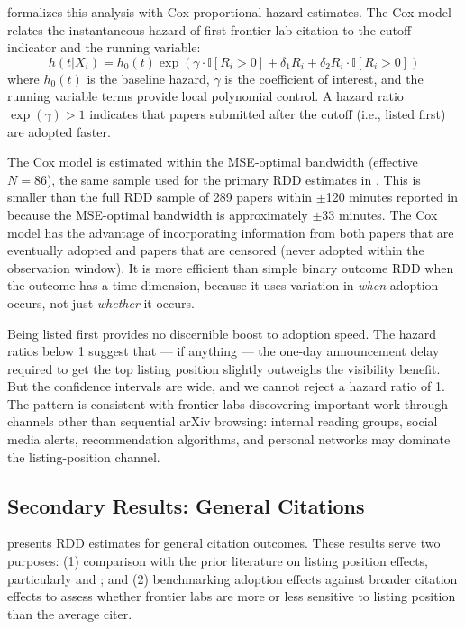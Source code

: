 \documentclass[12pt]{article}
\newcommand{\ind}{\mathbb{I}}
\begin{document}
 formalizes this analysis with Cox proportional hazard estimates. The Cox model relates the instantaneous hazard of first frontier lab citation to the cutoff indicator and the running variable:
\begin{equation}
h(t | X_i) = h_0(t) \exp\left(\gamma \cdot \ind[R_i > 0] + \delta_1 R_i + \delta_2 R_i \cdot \ind[R_i > 0]\right)
\end{equation}
where $h_0(t)$ is the baseline hazard, $\gamma$ is the coefficient of interest, and the running variable terms provide local polynomial control. A hazard ratio $\exp(\gamma) > 1$ indicates that papers submitted after the cutoff (i.e., listed first) are adopted faster.


  


The Cox model is estimated within the MSE-optimal bandwidth (effective $N = 86$), the same sample used for the primary RDD estimates in . This is smaller than the full RDD sample of 289 papers within $\pm$120 minutes reported in  because the MSE-optimal bandwidth is approximately $\pm$33 minutes. The Cox model has the advantage of incorporating information from both papers that are eventually adopted and papers that are censored (never adopted within the observation window). It is more efficient than simple binary outcome RDD when the outcome has a time dimension, because it uses variation in \textit{when} adoption occurs, not just \textit{whether} it occurs.

Being listed first provides no discernible boost to adoption speed. The hazard ratios below 1 suggest that --- if anything --- the one-day announcement delay required to get the top listing position slightly outweighs the visibility benefit. But the confidence intervals are wide, and we cannot reject a hazard ratio of 1. The pattern is consistent with frontier labs discovering important work through channels other than sequential arXiv browsing: internal reading groups, social media alerts, recommendation algorithms, and personal networks may dominate the listing-position channel.

\subsection{Secondary Results: General Citations}

 presents RDD estimates for general citation outcomes. These results serve two purposes: (1) comparison with the prior literature on listing position effects, particularly \citet{feenberg2017} and \citet{haque2009, haque2010}; and (2) benchmarking adoption effects against broader citation effects to assess whether frontier labs are more or less sensitive to listing position than the average citer.
\end{document}
